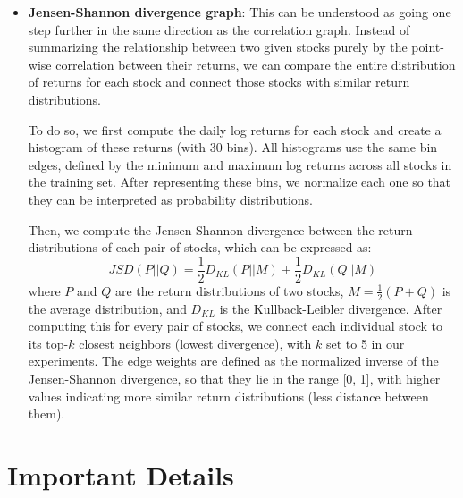 \documentclass{article}
\begin{document}
\begin{appendix}
\begin{itemize}
              Then, the edge weights are defined as the normalized correlation coefficients, so that they lie in the range [0, 1]. Thus, most of them lie in the range [0.5, 1], as we only consider the top-5 most correlated neighbors for each stock.

              This relationship is added by means of a double-headed edge, since the GNN uses directed edges but the correlation relationship is symmetric.
        \item \textbf{Jensen-Shannon divergence graph}: This can be understood as going one step further in the same direction as the correlation graph. Instead of summarizing the relationship between two given stocks purely by the point-wise correlation between their returns, we can compare the entire distribution of returns for each stock and connect those stocks with similar return distributions.

              To do so, we first compute the daily log returns for each stock and create a histogram of these returns (with 30 bins). All histograms use the same bin edges, defined by the minimum and maximum log returns across all stocks in the training set. After representing these bins, we normalize each one so that they can be interpreted as probability distributions.

              Then, we compute the Jensen-Shannon divergence between the return distributions of each pair of stocks, which can be expressed as:
              \begin{equation}
                  JSD(P || Q) = \frac{1}{2} D_{KL}(P || M) + \frac{1}{2} D_{KL}(Q || M)
              \end{equation}
              where $P$ and $Q$ are the return distributions of two stocks, $M = \frac{1}{2}(P + Q)$ is the average distribution, and $D_{KL}$ is the Kullback-Leibler divergence. After computing this for every pair of stocks, we connect each individual stock to its top-$k$ closest neighbors (lowest divergence), with $k$ set to 5 in our experiments. The edge weights are defined as the normalized inverse of the Jensen-Shannon divergence, so that they lie in the range [0, 1], with higher values indicating more similar return distributions (less distance between them).
    \end{itemize}

    \section{Important Details}


\end{appendix}
\end{document}
